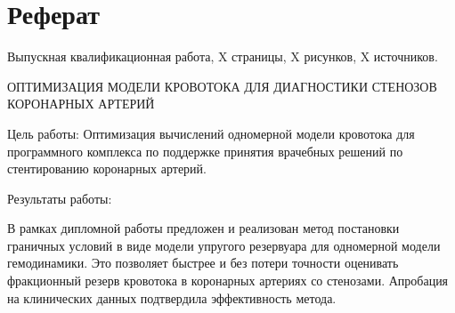 \chapter*{Реферат}

Выпускная квалификационная работа, X страницы, X рисунков, X источников.

ОПТИМИЗАЦИЯ МОДЕЛИ КРОВОТОКА ДЛЯ ДИАГНОСТИКИ СТЕНОЗОВ КОРОНАРНЫХ АРТЕРИЙ

Цель работы:
Оптимизация вычислений одномерной модели кровотока для программного комплекса по поддержке принятия врачебных решений по стентированию коронарных артерий.

Результаты работы:

В рамках дипломной работы предложен и реализован метод постановки граничных условий в виде модели упругого резервуара для одномерной модели гемодинамики. Это позволяет быстрее и без потери точности оценивать фракционный резерв кровотока в коронарных артериях со стенозами. Апробация на клинических данных подтвердила эффективность метода.
